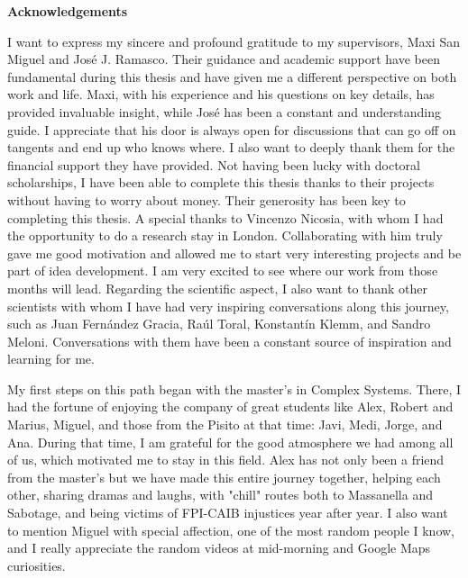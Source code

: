 \pagebreak
\thispagestyle{empty}
\textbf{ \huge Acknowledgements}

\vspace*{0.5 cm}

I want to express my sincere and profound gratitude to my supervisors, Maxi San Miguel and José J. Ramasco. Their guidance and academic support have been fundamental during this thesis and have given me a different perspective on both work and life. Maxi, with his experience and his questions on key details, has provided invaluable insight, while José has been a constant and understanding guide. I appreciate that his door is always open for discussions that can go off on tangents and end up who knows where. I also want to deeply thank them for the financial support they have provided. Not having been lucky with doctoral scholarships, I have been able to complete this thesis thanks to their projects without having to worry about money. Their generosity has been key to completing this thesis. A special thanks to Vincenzo Nicosia, with whom I had the opportunity to do a research stay in London. Collaborating with him truly gave me good motivation and allowed me to start very interesting projects and be part of idea development. I am very excited to see where our work from those months will lead. Regarding the scientific aspect, I also want to thank other scientists with whom I have had very inspiring conversations along this journey, such as Juan Fernández Gracia, Raúl Toral, Konstantín Klemm, and Sandro Meloni. Conversations with them have been a constant source of inspiration and learning for me.

My first steps on this path began with the master's in Complex Systems. There, I had the fortune of enjoying the company of great students like Alex, Robert and Marius, Miguel, and those from the Pisito at that time: Javi, Medi, Jorge, and Ana. During that time, I am grateful for the good atmosphere we had among all of us, which motivated me to stay in this field. Alex has not only been a friend from the master's but we have made this entire journey together, helping each other, sharing dramas and laughs, with "chill" routes both to Massanella and Sabotage, and being victims of FPI-CAIB injustices year after year. I also want to mention Miguel with special affection, one of the most random people I know, and I really appreciate the random videos at mid-morning and Google Maps curiosities.

